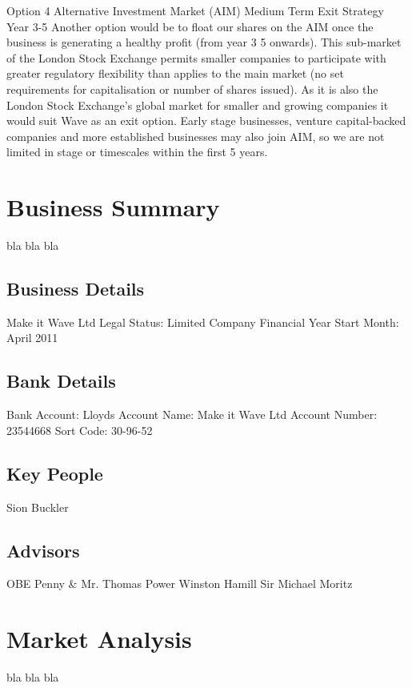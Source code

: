 \documentclass[letterpaper,10pt,openany,oneside,english]{sphinxmanual}
\begin{document}
Option 4 \textendash{} Alternative Investment Market (AIM)
Medium Term Exit Strategy Year 3-5
Another option would be to float our shares on the AIM once the business is generating a
healthy profit (from year 3 \textendash{} 5 onwards). This sub-market of the London Stock Exchange permits
smaller companies to participate with greater regulatory flexibility than applies to the main
market (no set requirements for capitalisation or number of shares issued). As it is also the
London Stock Exchange’s global market for smaller and growing companies it would suit Wave
as an exit option. Early stage businesses, venture capital-backed companies and more
established businesses may also join AIM, so we are not limited in stage or timescales within the
first 5 years.


\chapter{Business Summary}
\label{\detokenize{business-summary:business-summary}}\label{\detokenize{business-summary::doc}}
bla bla bla


\section{Business Details}
\label{\detokenize{business-summary:business-details}}
Make it Wave Ltd
Legal Status: Limited Company
Financial Year Start Month: April 2011


\section{Bank Details}
\label{\detokenize{business-summary:bank-details}}
Bank Account: Lloyds
Account Name: Make it Wave Ltd
Account Number: 23544668
Sort Code: 30-96-52


\section{Key People}
\label{\detokenize{business-summary:key-people}}
Sion Buckler


\section{Advisors}
\label{\detokenize{business-summary:advisors}}
OBE Penny \& Mr. Thomas Power
Winston Hamill
Sir Michael Moritz


\chapter{Market Analysis}
\label{\detokenize{market-analysis:market-analysis}}\label{\detokenize{market-analysis::doc}}
bla bla bla
\end{document}
